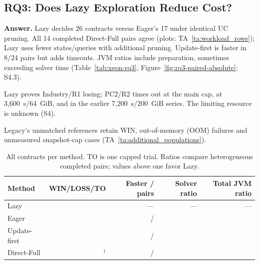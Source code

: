 \documentclass[acmsmall,screen,review,anonymous]{acmart}
\begin{document}

\subsection{RQ3: Does Lazy Exploration Reduce Cost?}
\label{sec:granularity-unit}
\label{sec:rq3}

\textbf{Answer.} Lazy decides 26 contracts versus Eager's 17 under identical UC pruning. All 14 completed Direct-Full pairs agree (plots: TA~\ref{ta:workload_rows}); Lazy uses fewer states/queries with additional pruning. Update-first is faster in 8/24 pairs but adds timeouts. JVM ratios include preparation, sometimes exceeding solver time (Table~\ref{tab:xeon-rq3}, Figure~\ref{fig:rq3-paired-absolute}; S4.3).

Lazy proves Industry/R1 losing; PC2/R2 times out at the main cap, at 3,600~s/64~GiB, and in the earlier 7,200~s/200~GiB series. The limiting resource is unknown (S4).

Legacy's unmatched references retain \LegacyNativeWins{} WIN, \LegacyNativeOOM{} out-of-memory (OOM) failures and \LegacyCaptureNM{} unmeasured snapshot-cap cases (TA~\ref{ta:additional_populations}).



\begin{table}[!tp]
\caption{All \ApplicationContracts{} contracts per method. TO is one capped trial. Ratios compare heterogeneous completed pairs; values above one favor Lazy.}
\label{tab:xeon-rq3}\label{tab:paired-costs}
\centering\small
\begin{tabular}{@{}lrrrr@{}}\toprule
Method & WIN/LOSS/TO & Faster / pairs & Solver ratio & Total JVM ratio\\\midrule
Lazy & \FixedLazyOutcomes{} & --- & --- & ---\\
Eager & \FixedEagerOutcomes{} & \FixedEagerFaster{} / \FixedEagerPairs{} & \FixedEagerSolverRatio{} & \FixedEagerJVMRatio{}\\
Update-first & \FixedUpdateFirstOutcomes{} & \FixedUpdateFirstFaster{} / \FixedUpdateFirstPairs{} & \FixedUpdateFirstSolverRatio{} & \FixedUpdateFirstJVMRatio{}\\
Direct-Full & \FixedDirectFullOutcomes{}$^{\dagger}$ & \FixedDirectFullFaster{} / \FixedDirectFullPairs{} & \FixedDirectFullSolverRatio{} & \FixedDirectFullJVMRatio{}\\\bottomrule
\end{tabular}
\par{}
\end{table}
\end{document}
